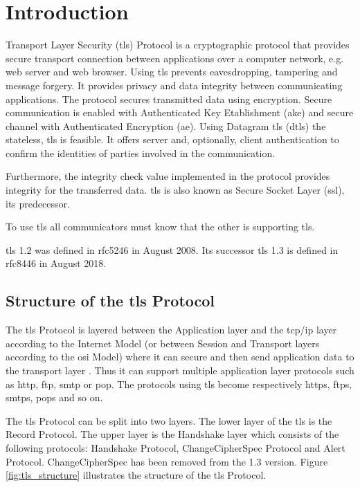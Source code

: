 \chapter{Introduction}
\label{chap:introduction}

Transport Layer Security (\gls{tls}) Protocol is a cryptographic protocol that provides secure transport connection between applications over a computer network, e.g. web server and web browser. 
Using \gls{tls} prevents eavesdropping, tampering and message forgery. It provides privacy and data integrity between communicating applications. The protocol secures transmitted data using encryption. Secure communication is enabled with Authenticated Key Etablishment (\gls{ake}) and secure channel with Authenticated Encryption (\gls{ae}). 
Using Datagram \gls{tls} (\gls{dtls}) the stateless, \gls{tls} is feasible. It offers server and, optionally, client authentication to confirm the identities of parties involved in the communication. 
 
Furthermore, the integrity check value implemented in the protocol provides integrity for the transferred data. \gls{tls} is also known as Secure Socket Layer (\gls{ssl}), its predecessor. 
 
To use \gls{tls} all communicators must know that the other is supporting \gls{tls}.

\gls{tls} 1.2 was defined in \gls{rfc}5246 in August 2008. Its successor \gls{tls} 1.3 is defined in \gls{rfc}8446 in August 2018.
 \cite{RFC5246}\cite{ms:overview}

\section{Structure of the \gls{tls} Protocol}
\label{sec:stucture}

The \gls{tls} Protocol is layered between the Application layer and the \gls{tcp}/\gls{ip} layer according to the Internet Model (or between Session and Transport layers according to the \gls{osi} Model) where it can secure and then send application data to the transport layer \cite{ms:overview}. Thus it can support multiple application layer protocols such as \gls{http}, \gls{ftp}, \gls{smtp} or \gls{pop}. The protocols using \gls{tls} become respectively \gls{https}, \gls{ftps}, \gls{smtps}, \gls{pops} and so on.

The \gls{tls} Protocol can be split into two layers. The lower layer of the \gls{tls} is the Record Protocol. The upper layer is the Handshake layer which consists of the following protocols: Handshake Protocol, ChangeCipherSpec Protocol and Alert Protocol. ChangeCipherSpec has been removed from the 1.3 version. Figure \ref{fig:tls_structure} illustrates the structure of the \gls{tls} Protocol. \cite{tlsstrukt}

